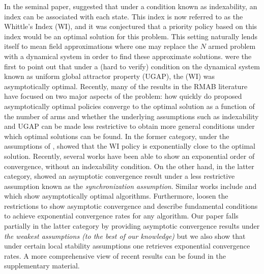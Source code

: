In the seminal paper, \citet{Wh88} suggested that under a condition known as indexability, an index can be associated with each state. This index is now referred to as the Whittle's Index (WI), and it was conjectured that a priority policy based on this index would be an optimal solution for this problem.  This setting naturally lends itself to mean field approximations where one may replace the $N$ armed problem with a dynamical system in order to find these approximate solutions. \citep{WW90} were the first to point out that under a (hard to verify) condition on the dynamical system known as uniform global attractor property (UGAP), the (WI) was asymptotically optimal. Recently, many of the results in the RMAB literature have focused on two major aspects of the problem: how quickly do proposed asymptotically optimal policies converge to the optimal solution as a function of the number of arms and whether the underlying assumptions such as indexability and UGAP can be made less restrictive to obtain more general conditions under which optimal solutions can be found. In the former category, under the assumptions of \citet{WW90}, \citet{GGY23} showed that the WI policy is exponentially close to the optimal solution. Recently, several works have been able to show an exponential order of convergence, \citet{GGY23b, HXCW24} without an indexability condition. On the other hand, in the latter category, \citet{HXCW23} showed an asymptotic convergence result under a less restrictive assumption known as the \emph{synchronization assumption}. Similar works include \citet{yan2024} and \citet{hong2024unichain} which show asymptotically optimal algorithms. Furthermore, \citet{HXCW24} loosen the restrictions to show asymptotic convergence and describe fundamental conditions to achieve exponential convergence rates for any algorithm. Our paper falls partially in the latter category by providing asymptotic convergence results under \emph{the weakest assumptions (to the best of our knowledge)} but we also show that under certain local stability assumptions one retrieves exponential convergence rates. A more comprehensive view of recent results can be found in the supplementary material.


